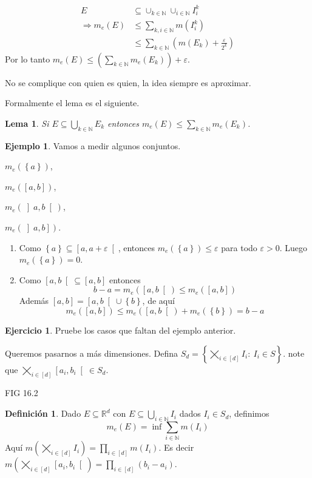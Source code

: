 \documentclass[12pt]{article}
\theoremstyle{plain}
\newtheorem{Lem}[Th]{Lema}             %
\theoremstyle{definition}
\newtheorem{Def}[Th]{Definición}       %
\newtheorem{Ex}[Th]{Ejemplo}               %
\newtheorem{Ej}[Th]{Ejercicio}
\theoremstyle{remark}
\numberwithin{equation}{section}
\newcommand{\bN}{\mathbb{N}}        %
\newcommand{\bR}{\mathbb{R}}        %
\renewcommand{\leq}{\leqslant}      %
\renewcommand{\:}{\colon}           %
\newcommand{\conj}[1]{\left\lbrace#1\right\rbrace}
\newcommand{\bonj}[1]{\left\lbrack#1\right\rbrack}
\newcommand{\obonj}[1]{\left\rbrack#1\right\lbrack}
\newcommand{\rbonj}[1]{\left\rbrack#1\right\rbrack}
\newcommand{\lbonj}[1]{\left\lbrack#1\right\lbrack}
\begin{document}
\begin{multicols}{2}
\begin{ptcbp}
\begin{align*}
 E&\subseteq\cup_{k\in\bN}\cup_{i\in\bN}I_i^k\\
 \Rightarrow m_e(E)&\leq \sum_{k,i\in\bN}m(I_i^k)\\
 &\leq\sum_{k\in\bN}\left(m(E_k)+\frac{\varepsilon}{2^k}\right)
\end{align*}
Por lo tanto $m_e(E)\leq\left(\sum_{k\in\bN}m_e(E_k)\right)+\varepsilon$.
\end{ptcbp}
No se complique con quien es quien, la idea siempre es aproximar. \par
Formalmente el lema es el siguiente.
\begin{Lem}
  Si $E\subseteq\bigcup_{k\in\bN} E_k$ entonces $m_e(E)\leq\sum_{k\in\bN}m_e(E_k)$.
\end{Lem}

\begin{Ex}
  Vamos a medir algunos conjuntos.
  \begin{enumerate}
  \begin{multicols}{2}
    \item $m_e(\conj{a})$,
    \item $m_e(\bonj{a,b})$,
    \item $m_e(\obonj{a,b})$,
    \item $m_e(\rbonj{a,b})$.
    \end{multicols}
  \end{enumerate}
\end{Ex}

\begin{ptcb}
\begin{enumerate}
  \item Como $\conj{a}\subseteq\lbonj{a,a+\varepsilon}$, entonces $m_e(\conj{a})\leq\varepsilon$ para todo $\varepsilon>0$. Luego $m_e(\conj{a})=0$.
  \item Como $\lbonj{a,b}\subseteq\bonj{a,b}$ entonces
  $$b-a=m_e(\lbonj{a,b})\leq m_e(\bonj{a,b})$$
  Además $\bonj{a,b}=\lbonj{a,b}\cup\conj{b}$, de aquí
  $$m_e(\bonj{a,b})\leq m_e(\lbonj{a,b})+m_e(\conj{b})=b-a$$
\end{enumerate}
\end{ptcb}

\begin{Ej}
  Pruebe los casos que faltan del ejemplo anterior.
\end{Ej}
Queremos pasarnos a más dimensiones. Defina $S_d=\conj{\bigtimes_{i\in\bonj{d}}I_i\:\ I_i\in S}$. note que $\bigtimes_{i\in\bonj{d}}\lbonj{a_i,b_i}\in S_d$.\par
FIG 16.2
\begin{Def}
  Dado $E\subseteq\bR^d$ con $E\subseteq\bigcup_{i\in\bN}I_i$ dados $I_i\in S_d$, definimos
  $$m_e(E)=\inf\sum_{i\in\bN}m(I_i)$$
  Aquí $m(\bigtimes_{i\in\bonj{d}}I_i)=\prod_{i\in\bonj{d}}m(I_i)$. Es decir $m(\bigtimes_{i\in\bonj{d}}\lbonj{a_i,b_i})=\prod_{i\in\bonj{d}}(b_i-a_i)$.
\end{Def}


\end{multicols}
\end{document}
